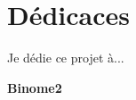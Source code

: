 \chapter*{Dédicaces }

\begin{center}

\begin{minipage}[c]{1\columnwidth}

{\large 
\vskip1cm

\centering
Je dédie ce projet à...
}


\end{minipage}

\end{center}

\vskip1.5cm
\begin{flushright}\LARGE
\bf{Binome2}
\end{flushright}








